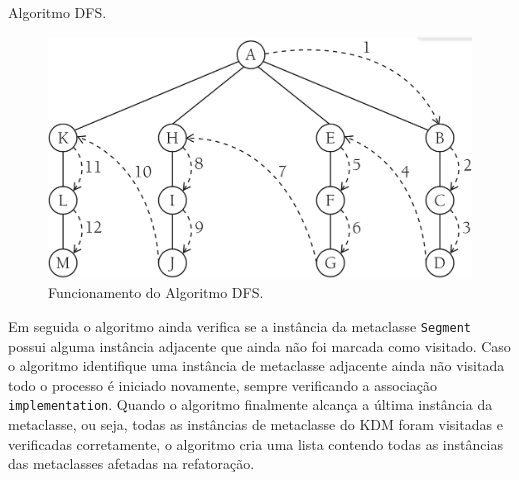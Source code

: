 \begin{algoritmo}[h]
     \SetAlgoLined
     \caption{Algoritmo DFS.}
     \label{alg:death1}
   \end{algoritmo}

\begin{figure}[h]
	\centering
	\caption{Funcionamento do Algoritmo DFS.}
	\label{fig:dfsalg}
	\includegraphics[scale=0.3]{images/algWorks2}
	\fautor
\end{figure}

Em seguida o algoritmo ainda verifica se a instância da metaclasse \texttt{Segment} possui alguma instância adjacente que ainda não foi marcada como visitado. Caso o algoritmo identifique uma instância de metaclasse adjacente ainda não visitada todo o processo é iniciado novamente, sempre verificando a associação \texttt{implementation}. Quando o algoritmo finalmente alcança a última instância da metaclasse, ou seja, todas as instâncias de metaclasse do KDM foram visitadas e verificadas corretamente, o algoritmo cria uma lista contendo todas as instâncias das metaclasses afetadas na refatoração. 

